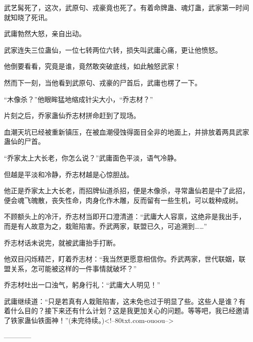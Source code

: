 \begin{this_body}
武艺髯死了，这次，武原句、戎豪竟也死了。有着命牌蛊、魂灯蛊，武家第一时间就知晓了死讯。

武庸勃然大怒，亲自出动。

武家连失三位蛊仙，一位七转两位六转，损失叫武庸心痛，更让他愤怒。

他倒要看看，究竟是谁，竟然敢突破底线，如此触怒武家！

然而下一刻，当他看到武原句、戎豪的尸首后，武庸也楞了一下。

“木像杀？”他眼眸猛地缩成针尖大小，“乔志材？”

片刻之后，乔家蛊仙乔志材拼命赶到了现场。

血潮天坑已经被重新镇压，在被血潮侵蚀得面目全非的地面上，并排放着两具武家蛊仙的尸首。

“乔家太上大长老，你怎么说？”武庸面色平淡，语气冷静。

但越是平淡和冷静，乔志材越是心惊胆战。

他正是乔家太上大长老，而招牌仙道杀招，便是木像杀，寻常蛊仙若是中了此招，便会魂飞魄散，丧失性命，肉身化作木雕，反而留有一些生机，可以栽种成树。

不顾额头上的冷汗，乔志材当即开口澄清道：“武庸大人容禀，这绝非是我出手，而是有人故意为之，栽赃陷害。乔武两家，联盟已久，可追溯到……”

乔志材话未说完，就被武庸抬手打断。

他双目闪烁精芒，盯着乔志材：“我当然更愿意相信你。乔武两家，世代联姻，联盟关系，怎可能被这样的一件事情就破坏？”

乔志材吐出一口浊气，躬身行礼：“武庸大人明见！”

武庸继续道：“只是若真有人栽赃陷害，这未免也过于明显了些。这些人是谁？有着什么目的？接下来还有什么计划？这是我更加关心的问题。等等吧，我已经邀请了铁家蛊仙铁面神！”(未完待续。)<!--80txt.com-ouoou-->

------------

\end{this_body}

